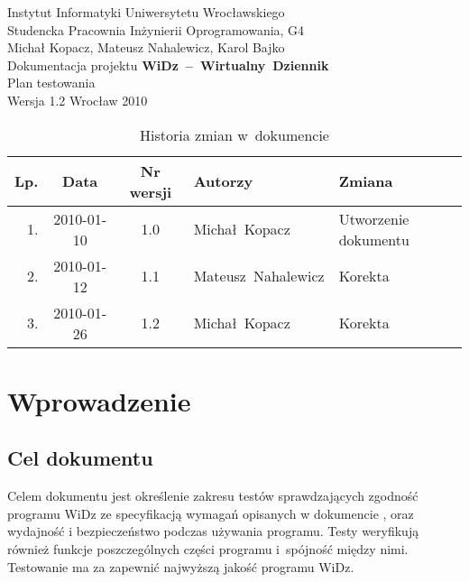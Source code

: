 \documentclass[12pt,leqno,twoside]{mwart}
\begin{document}
\begin{titlepage}
\begin{center}
Instytut Informatyki Uniwersytetu Wrocławskiego \\
Studencka Pracownia Inżynierii Oprogramowania, G4 \\
\vspace{4cm}
\Large Michał Kopacz, Mateusz Nahalewicz, Karol Bajko \\
\vspace{0.5cm}
\huge Dokumentacja projektu \mbox{\textbf{WiDz -- Wirtualny Dziennik}} \\ \Large Plan testowania\\
\vspace{1cm}
\normalsize Wersja 1.2
\vfill
\normalsize Wrocław 2010
\end{center}
\end{titlepage}

\newpage

\begin{table}
	\centering
	\caption{Historia zmian w~dokumencie}
		\begin{tabular}{|r|c|c|l|l|}
		\hline
		Lp. 	& Data       & Nr wersji 	& Autorzy           		& Zmiana \\ \hline
		1.   	& 2010-01-10 & 1.0       	& \mbox{Michał Kopacz} & Utworzenie dokumentu \\ \hline
		2.   	& 2010-01-12 & 1.1       	& \mbox{Mateusz Nahalewicz} & Korekta \\ \hline
		3.   	& 2010-01-26 & 1.2       	& \mbox{Michał Kopacz} & Korekta \\ \hline
		\end{tabular}
\end{table}

\newpage

\tableofcontents

\newpage

\section{Wprowadzenie}
\subsection{Cel dokumentu}
\noindent Celem dokumentu jest określenie zakresu testów sprawdzających zgodność programu WiDz ze specyfikacją wymagań opisanych w dokumencie \cite{WYM}, oraz wydajność i bezpieczeństwo podczas używania programu. Testy weryfikują również funkcje poszczególnych części programu i~spójność między nimi. Testowanie ma za zapewnić najwyższą jakość programu WiDz. \\
\end{document}
